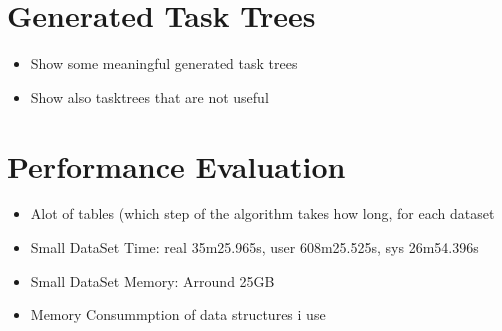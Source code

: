 \section{Generated Task Trees}
\begin{itemize}
	\item Show some meaningful generated task trees
	\item Show also tasktrees that are not useful
\end{itemize}
\section{Performance Evaluation}

\begin{itemize}
	\item Alot of tables (which step of the algorithm takes how long, for each dataset

	\item Small DataSet Time: real    35m25.965s, user    608m25.525s, sys     26m54.396s
	\item Small DataSet Memory: Arround 25GB
	\item Memory Consummption of data structures i use


\end{itemize}

